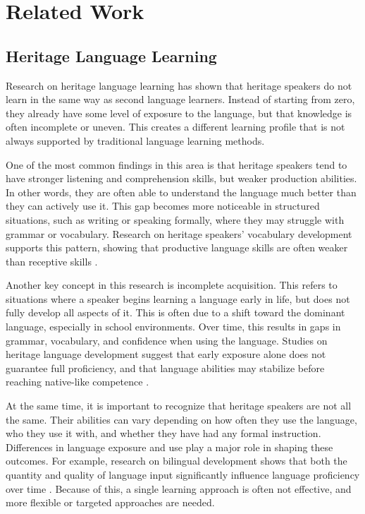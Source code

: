 \documentclass[12pt]{article}
\begin{document}
  \section{Related Work}

\subsection{Heritage Language Learning}

Research on heritage language learning has shown that heritage speakers do not learn in the same way as second language learners. Instead of starting from zero, they already have some level of exposure to the language, but that knowledge is often incomplete or uneven. This creates a different learning profile that is not always supported by traditional language learning methods.

One of the most common findings in this area is that heritage speakers tend to have stronger listening and comprehension skills, but weaker production abilities. In other words, they are often able to understand the language much better than they can actively use it. This gap becomes more noticeable in structured situations, such as writing or speaking formally, where they may struggle with grammar or vocabulary. Research on heritage speakers’ vocabulary development supports this pattern, showing that productive language skills are often weaker than receptive skills \cite{gharibi2017factors}.

Another key concept in this research is incomplete acquisition. This refers to situations where a speaker begins learning a language early in life, but does not fully develop all aspects of it. This is often due to a shift toward the dominant language, especially in school environments. Over time, this results in gaps in grammar, vocabulary, and confidence when using the language. Studies on heritage language development suggest that early exposure alone does not guarantee full proficiency, and that language abilities may stabilize before reaching native-like competence \cite{montrul2008gender}.

At the same time, it is important to recognize that heritage speakers are not all the same. Their abilities can vary depending on how often they use the language, who they use it with, and whether they have had any formal instruction. Differences in language exposure and use play a major role in shaping these outcomes. For example, research on bilingual development shows that both the quantity and quality of language input significantly influence language proficiency over time \cite{hoff2018bilingual}. Because of this, a single learning approach is often not effective, and more flexible or targeted approaches are needed.
\end{document}
